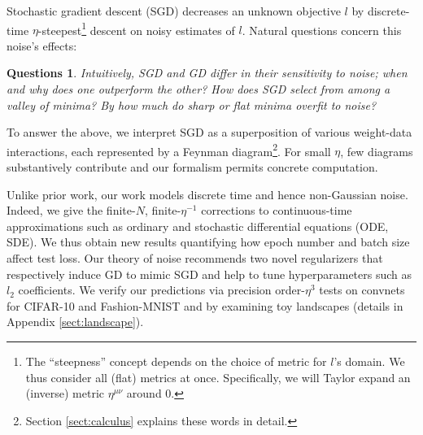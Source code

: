 \documentclass{article}
\theoremstyle{plain}
\newtheorem*{quests*}{Questions}
\theoremstyle{definition}
\begin{document}
        Stochastic gradient descent (SGD) decreases an unknown objective $l$ by
        discrete-time $\eta$-steepest\footnote{
            The ``steepness'' concept depends on the choice of metric for
            $l$'s domain.  We thus consider all (flat) metrics at once.
            Specifically, we will Taylor expand an (inverse) metric
            $\eta^{\mu\nu}$ around $0$.
        } descent on noisy estimates of $l$.
        Natural questions concern this noise's effects:
        \begin{quests*}
            Intuitively, SGD and GD differ in their sensitivity to noise;
                when and why does one outperform the other?
            How does SGD select from among a valley of minima?
            By how much do sharp or flat minima overfit to noise?
        \end{quests*}
        To answer the above, we interpret SGD as a superposition of
        various weight-data interactions, each represented by a Feynman
        diagram\footnote{
            Section \ref{sect:calculus} explains these words in detail.
        }.
        For small $\eta$, few diagrams substantively contribute and
        our formalism permits concrete computation.



        Unlike prior work, our work models discrete time and hence non-Gaussian
        noise.  Indeed, we give the finite-$N$, finite-$\eta^{-1}$ corrections
        to continuous-time approximations such as ordinary and stochastic
        differential equations (ODE, SDE).  
        We thus obtain new results
        quantifying how epoch number and batch size affect test loss.
        Our
        theory of noise recommends two novel regularizers that respectively
        induce GD to mimic SGD and help to tune hyperparameters such as $l_2$
        coefficients.
        We verify our predictions via precision order-$\eta^3$
        tests on convnets for CIFAR-10 and Fashion-MNIST and 
        by examining toy landscapes (details in Appendix \ref{sect:landscape}).
\end{document}
